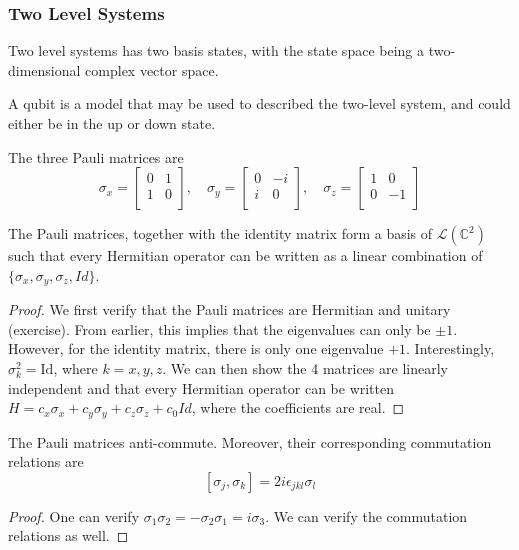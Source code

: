 \documentclass[a4paper]{article}
\begin{document}
\subsubsection*{Two Level Systems}
Two level systems has two basis states, with the state space being a two-dimensional complex vector space.
\begin{defi}[Qubit]
A qubit is a model that may be used to described the two-level system, and could either be in the up or down state.
\end{defi}
\begin{defi}
The three Pauli matrices are
$$\sigma_x=\begin{bmatrix}0&1\\1&0\\\end{bmatrix},\quad \sigma_y=\begin{bmatrix}0&-i\\i&0\\\end{bmatrix},\quad\sigma_z=\begin{bmatrix}1&0\\0&-1\\\end{bmatrix}$$
\end{defi}
\begin{thm}
The Pauli matrices, together with the identity matrix form a basis of $\mathcal{L}(\mathbb{C}^2)$ such that every Hermitian operator can be written as a linear combination of $\{\sigma_x,\sigma_y,\sigma_z,Id\}$.
\end{thm}
\begin{proof}
We first verify that the Pauli matrices are Hermitian and unitary (exercise). From earlier, this implies that the eigenvalues can only be $\pm1$. However, for the identity matrix, there is only one eigenvalue $+1$. Interestingly, $\sigma_k^2=\text{Id}$, where $k=x,y,z$. We can then show the 4 matrices are linearly independent and that every Hermitian operator can be written $H=c_x\sigma_x+c_y\sigma_y+c_z\sigma_z+c_0Id$, where the coefficients are real.
\end{proof}
\begin{thm}
The Pauli matrices anti-commute. Moreover, their corresponding commutation relations are
$$[\sigma_j,\sigma_k]=2i\epsilon_{jkl}\sigma_l$$
\end{thm}
\begin{proof}
One can verify $\sigma_1\sigma_2=-\sigma_2\sigma_1=i\sigma_3$. We can verify the commutation relations as well.
\end{proof}
\end{document}

